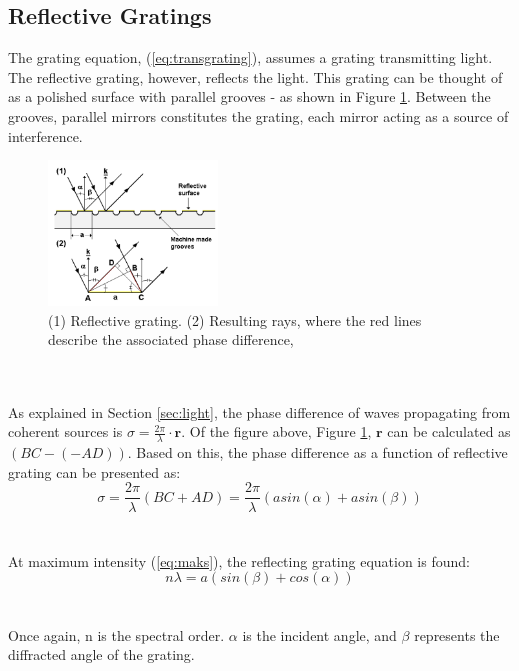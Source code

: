 \subsection{Reflective Gratings}
The grating equation, (\ref{eq:transgrating}), assumes a grating transmitting light. The reflective grating, however, reflects the light. This grating can be thought of as a polished surface with parallel grooves - as shown in Figure \ref{fig:refgrating}. Between the grooves, parallel mirrors constitutes the grating, each mirror acting as a source of interference. 
\begin{figure}[h]
    \centering
    \includegraphics[width=0.4\textwidth]{Images/theory/refgrating.png}
    \caption[Reflective
Grating]{(1) Reflective
grating. (2) Resulting rays, where the red lines describe the associated phase difference, \cite{sigernes2018}}
    \label{fig:refgrating}
\end{figure}
\\\\
As explained in Section \ref{sec:light}, the phase difference of waves propagating from coherent sources is $\sigma = \frac{2 \pi}{\lambda} \cdot \textbf{r}$. Of the figure above, Figure \ref{fig:refgrating}, $\textbf{r}$ can be calculated as $(BC - (-AD))$. Based on this, the phase difference as a function of reflective grating can be presented as:
\begin{equation}
    \sigma = \frac{2 \pi}{\lambda}(BC + AD) = \frac{2 \pi}{\lambda} (a sin(\alpha) + a sin(\beta))
\end{equation}
\\\\
At maximum intensity (\ref{eq:maks}), the reflecting grating equation is found:
\begin{equation}
    n \lambda = a (sin(\beta) + cos(\alpha))
    \label{eq:refgrating}
\end{equation}
\\\\
Once again, n is the spectral order. $\alpha$ is the incident angle, and $\beta$ represents the diffracted angle of the grating.

